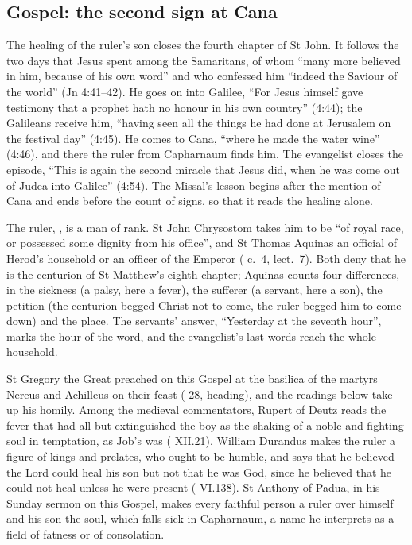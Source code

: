 \subsection{Gospel: the second sign at Cana}

The healing of the ruler's son closes the fourth chapter of St John. It
follows the two days that Jesus spent among the Samaritans, of whom ``many more
believed in him, because of his own word'' and who confessed him ``indeed the
Saviour of the world'' (Jn 4:41--42). He goes on into Galilee, ``For Jesus
himself gave testimony that a prophet hath no honour in his own country''
(4:44); the Galileans receive him, ``having seen all the things he had done at
Jerusalem on the festival day'' (4:45). He comes to Cana, ``where he made the
water wine'' (4:46), and there the ruler from Capharnaum finds him. The
evangelist closes the episode, ``This is again the second miracle that Jesus
did, when he was come out of Judea into Galilee'' (4:54). The Missal's lesson
begins after the mention of Cana and ends before the count of signs, so that
it reads the healing alone.

The ruler, , is a man of rank. St John Chrysostom takes him to
be ``of royal race, or possessed some dignity from his office'', and St Thomas
Aquinas an official of Herod's household or an officer of the Emperor ( c.~4, lect.~7). Both deny that he is the centurion of St Matthew's
eighth chapter; Aquinas counts four differences, in the sickness (a palsy, here
a fever), the sufferer (a servant, here a son), the petition (the centurion
begged Christ not to come, the ruler begged him to come down) and the place.
The servants' answer, ``Yesterday at the seventh hour'', marks the hour of the
word, and the evangelist's last words reach the whole household.

St Gregory the Great preached on this Gospel at the basilica of the martyrs
Nereus and Achilleus on their feast ( 28, heading),
and the readings below take up his homily. Among the medieval commentators,
Rupert of Deutz reads the fever that had all but extinguished the boy as the
shaking of a noble and fighting soul in temptation, as Job's was ( XII.21). William Durandus makes the ruler a figure of kings
and prelates, who ought to be humble, and says that he believed the Lord could
heal his son but not that he was God, since he believed that he could not heal
unless he were present ( VI.138). St Anthony of Padua, in his
Sunday sermon on this Gospel, makes every faithful person a ruler over himself
and his son the soul, which falls sick in Capharnaum, a name he interprets as a
field of fatness or of consolation.


